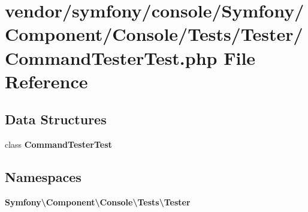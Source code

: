 \section{vendor/symfony/console/\+Symfony/\+Component/\+Console/\+Tests/\+Tester/\+Command\+Tester\+Test.php File Reference}
\label{_command_tester_test_8php}
\subsection*{Data Structures}
\begin{DoxyCompactItemize}
\item 
class {\bf Command\+Tester\+Test}
\end{DoxyCompactItemize}
\subsection*{Namespaces}
\begin{DoxyCompactItemize}
\item 
 {\bf Symfony\textbackslash{}\+Component\textbackslash{}\+Console\textbackslash{}\+Tests\textbackslash{}\+Tester}
\end{DoxyCompactItemize}
